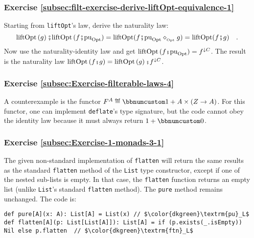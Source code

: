 
\subsubsection*{Exercise \ref{subsec:filt-exercise-derive-liftOpt-equivalence-1}}

Starting from \lstinline!liftOpt!\textsf{'}s law, derive the naturality law:
\[
\text{liftOpt}\left(g\right)\bef\text{liftOpt}\,(f\bef\text{pu}_{\text{Opt}})=\text{liftOpt}(f\bef\text{pu}_{\text{Opt}}\diamond_{_{\text{Opt}}}g)=\text{liftOpt}(f\bef g)\quad.
\]
Now use the naturality-identity law and get $\text{liftOpt}\,(f\bef\text{pu}_{\text{Opt}})=f^{\downarrow C}$.
The result is the naturality law $\text{liftOpt}\left(f\bef g\right)=\text{liftOpt}\left(g\right)\bef f^{\downarrow C}$.

\subsubsection*{Exercise \ref{subsec:Exercise-filterable-laws-4}}

A counterexample is the functor $F^{A}\triangleq\bbnum 1+A\times\left(Z\rightarrow A\right)$.
For this functor, one can implement \lstinline!deflate!\textsf{'}s type signature,
but the code cannot obey the identity law because it must always return
$1+\bbnum 0$.


\subsubsection*{Exercise \ref{subsec:Exercise-1-monads-3-1}}

The
given non-standard implementation of \lstinline!flatten! will return
the same results as the standard \lstinline!flatten! method of the
\lstinline!List! type constructor, except if one of the nested sub-lists
is empty. In that case, the \lstinline!flatten! function returns
an empty list (unlike \lstinline!List!\textsf{'}s standard \lstinline!flatten!
method). The \lstinline!pure! method remains unchanged. The code
is:
\begin{lstlisting}[mathescape=true]
def pure[A](x: A): List[A] = List(x) // $\color{dkgreen}\textrm{pu}_L$
def flatten[A](p: List[List[A]]): List[A] = if (p.exists(_.isEmpty)) Nil else p.flatten  // $\color{dkgreen}\textrm{ftn}_L$
\end{lstlisting}

